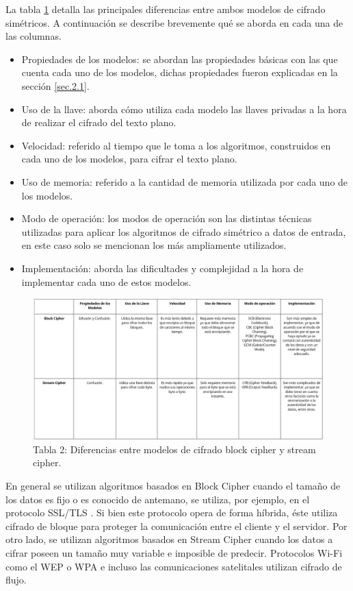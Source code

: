 \documentclass[a4paper,10pt]{article}
\begin{document}
	 La tabla \ref{Diferencias_Block_Stream_Cipher} detalla las principales diferencias entre ambos modelos de cifrado simétricos. A continuación se describe brevemente qué se aborda en cada una de las columnas.
	\begin{itemize}
		\item Propiedades de los modelos: se abordan las propiedades básicas con las que cuenta cada uno de los modelos, dichas propiedades fueron explicadas en la sección \ref{sec.2.1}.
		\item Uso de la llave: aborda cómo utiliza cada modelo las llaves privadas a la hora de realizar el cifrado del texto plano.
		\item Velocidad: referido al tiempo que le toma a los algoritmos, construidos en cada uno de los modelos, para cifrar el texto plano.
		\item Uso de memoria: referido a la cantidad de memoria utilizada por cada uno de los modelos.
		\item Modo de operación: los modos de operación son las distintas técnicas utilizadas para aplicar los algoritmos de cifrado simétrico a datos de entrada, en este caso solo se mencionan los más ampliamente utilizados.
		\item Implementación: aborda las dificultades y complejidad a la hora de implementar cada uno de estos modelos.
	\end{itemize}
	\begin{figure}[h]
		\centering
		\includegraphics[width=1.0\textwidth]{tablaBlockStreamCipher.PNG}
		\caption{Tabla 2: Diferencias entre modelos de cifrado block cipher y stream cipher.}
		\label{Diferencias_Block_Stream_Cipher}
	\end{figure}
	En general se utilizan algoritmos basados en Block Cipher cuando el tamaño de los datos es fijo o es conocido de antemano, se utiliza, por ejemplo, en el protocolo SSL/TLS \parencite{davies2011implementing}. Si bien este protocolo opera de forma híbrida, éste utiliza cifrado de bloque para proteger la comunicación entre el cliente y el servidor. Por otro lado, se utilizan algoritmos basados en Stream Cipher cuando los datos a cifrar poseen un tamaño muy variable e imposible de predecir. Protocolos Wi-Fi como el WEP o WPA e incluso las comunicaciones satelitales utilizan cifrado de flujo.
	
\end{document}
